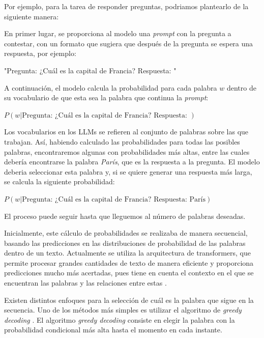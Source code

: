 \documentclass[11pt,spanish,listoffigures,listoftables]{tfgetsinf}
\begin{document}
Por ejemplo, para la tarea de responder preguntas, podriamos plantearlo de la siguiente manera:

En primer lugar, se proporciona al modelo una \textit{prompt} con la pregunta a contestar, con un formato que sugiera que después de la pregunta se espera una respuesta, por ejemplo: 

\begin{displayquote}
\centerline{"Pregunta: ¿Cuál es la capital de Francia? Respuesta: "}
\end{displayquote}

A continuación, el modelo calcula la probabilidad para cada palabra $w$ dentro de su vocabulario de que esta sea la palabra que continua la \textit{prompt}:

\begin{displayquote}
\centerline{$P(w|\text{Pregunta: ¿Cuál es la capital de Francia? Respuesta: })$}
\end{displayquote}

Los vocabularios en los LLMs se refieren al conjunto de palabras sobre las que trabajan. Así, habiendo calculado las probabilidades para todas las posibles palabras, encontraremos algunas con probabilidades más altas, entre las cuales debería encontrarse la palabra \textit{París}, que es la respuesta a la pregunta. El modelo deberia seleccionar esta palabra y, si se quiere generar una respuesta más larga, se calcula la siguiente probabilidad:

\begin{displayquote}
\centerline{$P(w|\text{Pregunta: ¿Cuál es la capital de Francia? Respuesta: París})$}
\end{displayquote}

El proceso puede seguir hasta que lleguemos al número de palabras deseadas.

Inicialmente, este cálculo de probabilidades se realizaba de manera secuencial, basando las predicciones en las distribuciones de probabilidad de las palabras dentro de un texto. Actualmente se utiliza la arquitectura de transformers, que permite procesar grandes cantidades de texto de manera eficiente y proporciona predicciones mucho más acertadas, pues tiene en cuenta el contexto en el que se encuentran las palabras y las relaciones entre estas \cite{burtsev2023working}.

Existen distintos enfoques para la selección de cuál es la palabra que sigue en la secuencia. Uno de los métodos más simples es utilizar el algoritmo de \textit{greedy decoding} \cite{gu2017trainablegreedydecodingneural}. El algoritmo \textit{greedy decoding} consiste en elegir la palabra con la probabilidad condicional más alta hasta el momento en cada instante.
\end{document}
